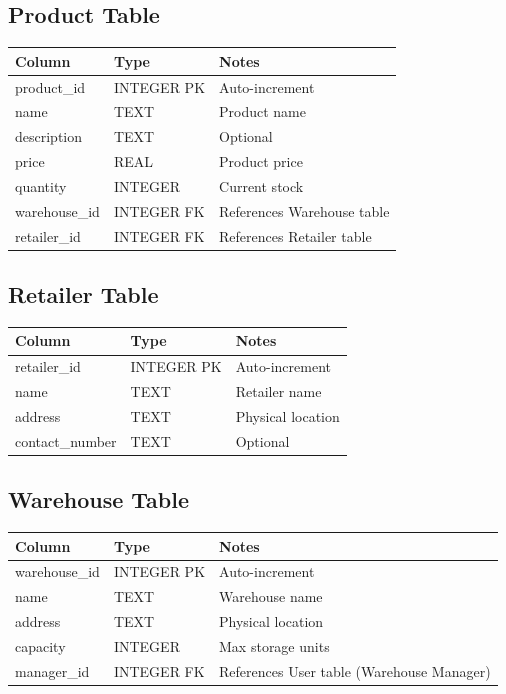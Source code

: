 \documentclass[12pt,a4paper]{article}
\begin{document}
\subsection{Product Table}
\begin{longtable}{|l|l|l|}
\hline
\textbf{Column} & \textbf{Type} & \textbf{Notes} \\
\hline
product\_id & INTEGER PK & Auto-increment \\
name & TEXT & Product name \\
description & TEXT & Optional \\
price & REAL & Product price \\
quantity & INTEGER & Current stock \\
warehouse\_id & INTEGER FK & References Warehouse table \\
retailer\_id & INTEGER FK & References Retailer table \\
\hline
\end{longtable}

\subsection{Retailer Table}
\begin{longtable}{|l|l|l|}
\hline
\textbf{Column} & \textbf{Type} & \textbf{Notes} \\
\hline
retailer\_id & INTEGER PK & Auto-increment \\
name & TEXT & Retailer name \\
address & TEXT & Physical location \\
contact\_number & TEXT & Optional \\
\hline
\end{longtable}

\subsection{Warehouse Table}
\begin{longtable}{|l|l|l|}
\hline
\textbf{Column} & \textbf{Type} & \textbf{Notes} \\
\hline
warehouse\_id & INTEGER PK & Auto-increment \\
name & TEXT & Warehouse name \\
address & TEXT & Physical location \\
capacity & INTEGER & Max storage units \\
manager\_id & INTEGER FK & References User table (Warehouse Manager) \\
\hline
\end{longtable}
\end{document}

